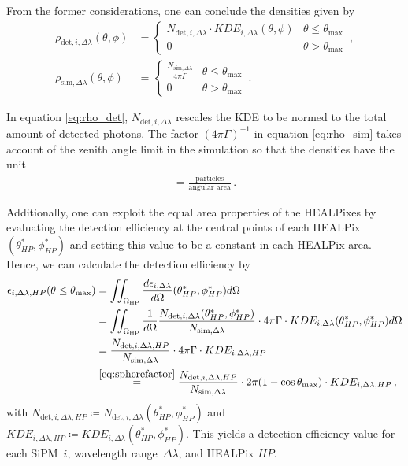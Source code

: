 From the former considerations, one can conclude the densities given by
\begin{subequations}
	\begin{align}
		\rho_{\text{det},i,\Delta\lambda}(\theta,\phi) &= 
		\begin{cases}
			N_{\text{det},i,\Delta\lambda}\cdot KDE_{i,\Delta\lambda}(\theta,\phi) & \theta\leq\theta_\text{max}\\
			0 & \theta > \theta_\text{max}
		\end{cases}\,,
		\label{eq:rho_det}
		\\
		\rho_{\text{sim},\Delta\lambda}(\theta,\phi) &= 
		\begin{cases}
			\frac{N_{\text{sim},\Delta\lambda}}{4\pi\Gamma} & \theta\leq\theta_\text{max}\\
			0 & \theta > \theta_\text{max}
		\end{cases}\,.
		\label{eq:rho_sim}
	\end{align}
\end{subequations}

In equation \eqref{eq:rho_det}, $N_{\text{det},i,\Delta\lambda}$ rescales the KDE to be normed to the total amount of detected photons. The factor $(4\pi\Gamma)^{-1}$ in equation \eqref{eq:rho_sim} takes account of the zenith angle limit in the simulation so that the densities have the unit
\begin{align}
	[\rho] = \frac{\text{particles}}{\text{angular area}}\,.
\end{align}

Additionally, one can exploit the equal area properties of the HEALPixes by evaluating the detection efficiency at the central points of each HEALPix $(\theta^\ast_{HP},\phi^\ast_{HP})$ and setting this value to be a constant in each HEALPix area. Hence, we can calculate the detection efficiency by
\begin{align}
	\epsilon_{i,\Delta\lambda,HP}(\theta\leq\theta_\text{max}) &= \iint_{\Omega_\text{HP}}  \frac{d\epsilon_{i,\Delta\lambda}}{d\Omega}(\theta^\ast_{HP},\phi^\ast_{HP}) d\Omega\nonumber\\
	&= \iint_{\Omega_\text{HP}}\frac{1}{d\Omega}\frac{N_{\text{det},i,\Delta\lambda}(\theta^\ast_{HP},\phi^\ast_{HP})}{N_{\text{sim},\Delta\lambda}}\cdot 4\pi\Gamma\cdot KDE_{i,\Delta\lambda}(\theta^\ast_{HP},\phi^\ast_{HP})d\Omega\nonumber\\
	&= \frac{N_{\text{det},i,\Delta\lambda,HP}}{N_{\text{sim},\Delta\lambda}}\cdot 4\pi\Gamma\cdot KDE_{i,\Delta\lambda,HP}\nonumber\\
	&\overset{\eqref{eq:spherefactor}}{=} \frac{N_{\text{det},i,\Delta\lambda,HP}}{N_{\text{sim},\Delta\lambda}}\cdot 2\pi(1-\cos\theta_\text{max})\cdot KDE_{i,\Delta\lambda,HP}\,,
	\label{eq:deteff}
\end{align}
with $N_{\text{det},i,\Delta\lambda,HP}\coloneqq N_{\text{det},i,\Delta\lambda}(\theta^\ast_{HP},\phi^\ast_{HP})$ and $KDE_{i,\Delta\lambda,HP}\coloneqq KDE_{i,\Delta\lambda}(\theta^\ast_{HP},\phi^\ast_{HP})$. This yields a detection efficiency value for each SiPM~$i$, wavelength range~$\Delta\lambda$, and HEALPix $HP$.\\

